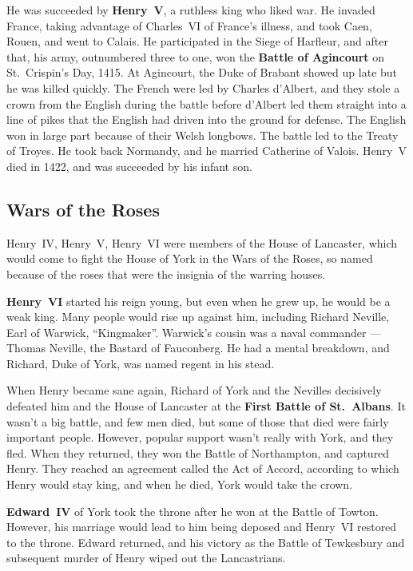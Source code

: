 He was succeeded by \textbf{Henry~V}, a ruthless king who liked war.
He invaded France, taking advantage of Charles~VI of France's illness,
and took Caen, Rouen, and went to Calais.
He participated in the Siege of Harfleur, and after that,
his army, outnumbered three to one, won the \textbf{Battle of Agincourt} on St.\ Crispin's Day, 1415.
At Agincourt, the Duke of Brabant showed up late but he was killed quickly.
The French were led by Charles d'Albert, and they stole a crown from the English during the battle
before d'Albert led them straight into a line of pikes that the English had driven into the ground for defense.
The English won in large part because of their Welsh longbows.
The battle led to the Treaty of Troyes.
He took back Normandy, and he married Catherine of Valois.
Henry~V died in 1422, and was succeeded by his infant son.

\subsection*{Wars of the Roses}

Henry~IV, Henry~V, Henry~VI were members of the House of Lancaster,
which would come to fight the House of York in the Wars of the Roses,
so named because of the roses that were the insignia of the warring houses.

\textbf{Henry~VI} started his reign young, but even when he grew up, he would be a weak king.
Many people would rise up against him, including Richard Neville, Earl of Warwick, ``Kingmaker''.
Warwick's cousin was a naval commander --- Thomas Neville, the Bastard of Fauconberg.
He had a mental breakdown, and Richard, Duke of York, was named regent in his stead.

When Henry became sane again, Richard of York and the Nevilles decisively defeated
him and the House of Lancaster at the \textbf{First Battle of St.\ Albans}.
It wasn't a big battle, and few men died, but some of those that died were fairly important people.
However, popular support wasn't really with York, and they fled.
When they returned, they won the Battle of Northampton, and captured Henry.
They reached an agreement called the Act of Accord, according to which Henry would stay king,
and when he died, York would take the crown.

\textbf{Edward~IV} of York took the throne after he won at the Battle of Towton.
However, his marriage would lead to him being deposed and Henry~VI restored to the throne.
Edward returned, and his victory as the Battle of Tewkesbury
and subsequent murder of Henry wiped out the Lancastrians.

